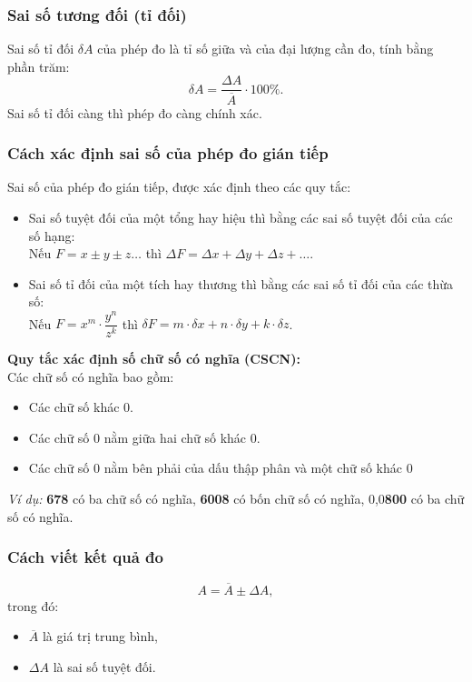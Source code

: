\subsubsection{Sai số tương đối (tỉ đối)}
Sai số tỉ đối $\delta A$ của phép đo là tỉ số giữa  và  của đại lượng cần đo, tính bằng phần trăm:
$$\delta A=\dfrac{\Delta A}{\overline A}\cdot 100\%.$$
Sai số tỉ đối càng  thì phép đo càng chính xác.

\subsubsection{Cách xác định sai số của phép đo gián tiếp}
Sai số của phép đo gián tiếp, được xác định theo các quy tắc:
\begin{itemize}
	\item Sai số tuyệt đối của một tổng hay hiệu thì bằng  các sai số tuyệt đối của các số hạng:\\
	Nếu $F=x\pm y\pm z \dots$ thì $\Delta F = \Delta x + \Delta y + \Delta z+\dots$.
	\item Sai số tỉ đối của một tích hay thương thì bằng  các sai số tỉ đối của các thừa số:\\ 
	Nếu $F= x^m\cdot\dfrac{y^n}{z^k}$ thì $\delta F=m\cdot\delta x+n\cdot\delta y +k\cdot\delta z$.
\end{itemize}
\textbf{Quy tắc xác định số chữ số có nghĩa (CSCN):}\\
Các chữ số có nghĩa bao gồm:
\begin{itemize}
	\item Các chữ số khác 0.
	\item Các chữ số 0 nằm giữa hai chữ số khác 0.
	\item Các chữ số 0 nằm bên phải của dấu	thập phân và một chữ số khác 0
\end{itemize}
\textit{Ví dụ:} \textbf{678} có ba chữ số có nghĩa, \textbf{6008} có bốn chữ số có nghĩa, 0,0\textbf{800} có ba chữ số có nghĩa.
\subsubsection{Cách viết kết quả đo}
$$A=\overline{A} \pm \Delta A,$$
trong đó:
\begin{itemize}
	\item $\overline A$ là giá trị trung bình,
	\item $\Delta A$ là sai số tuyệt đối. 
\end{itemize}
